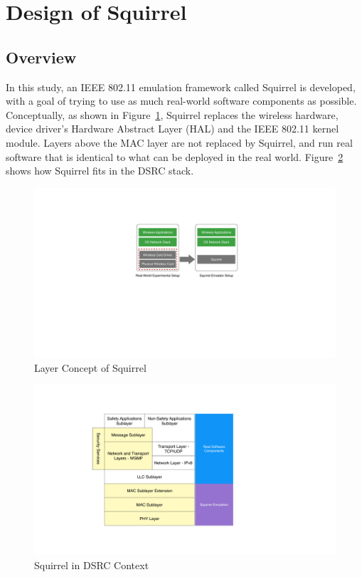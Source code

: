 \documentclass[12pt]{report}
\begin{document}
\section{Design of Squirrel}
\subsection{Overview}

In this study, an IEEE 802.11 emulation framework called Squirrel is developed, with a goal of trying to use as much real-world software components as possible. Conceptually, as shown in Figure~\ref{fig:squirrel_concept}, Squirrel replaces the wireless hardware, device driver's Hardware Abstract Layer (HAL) and the IEEE 802.11 kernel module. Layers above the MAC layer are not replaced by Squirrel, and run real software that is identical to what can be deployed in the real world. Figure~\ref{fig:squirrel_dsrc} shows how Squirrel fits in the DSRC stack.

\begin{figure}[h]
  \begin{center}
    \includegraphics[width=.7\textwidth]{figures/squirrelConcept.pdf}
    \caption{\label{fig:squirrel_concept}Layer Concept of Squirrel}
  \end{center}
\end{figure}

\begin{figure}[h]
  \begin{center}
    \includegraphics[width=.7\textwidth]{figures/squirrelDSRC.pdf}
    \caption{\label{fig:squirrel_dsrc}Squirrel in DSRC Context}
  \end{center}
\end{figure}
\end{document}
